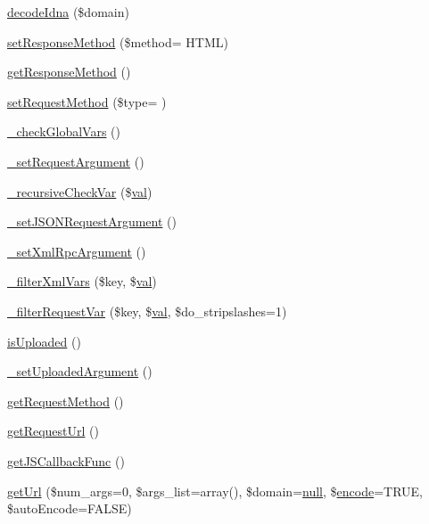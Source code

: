 \begin{DoxyCompactItemize}
\item 
\hyperlink{classContext_a122117b49e4926d40dc6fc76297792bc}{decode\+Idna} (\$domain)
\item 
\hyperlink{classContext_afc58a19e296dfc70a95648f35bb0f3a9}{set\+Response\+Method} (\$method= \textquotesingle{}H\+T\+ML\textquotesingle{})
\item 
\hyperlink{classContext_a1d02a15209360034cd719d8b08cb5061}{get\+Response\+Method} ()
\item 
\hyperlink{classContext_aa47d184757d451009f0597153d323ccc}{set\+Request\+Method} (\$type= \textquotesingle{}\textquotesingle{})
\item 
\hyperlink{classContext_a8030f7c76467bfcec812be76f55571cd}{\+\_\+check\+Global\+Vars} ()
\item 
\hyperlink{classContext_acfc274753d9687732458bfaba540c120}{\+\_\+set\+Request\+Argument} ()
\item 
\hyperlink{classContext_aae89f13e0d99577a6cb8a3bac584cee1}{\+\_\+recursive\+Check\+Var} (\$\hyperlink{ckeditor_2js_2xe__interface_8js_a4fb96abdf073a439bca5e051c333b35d}{val})
\item 
\hyperlink{classContext_ae07924273ca1b17fe67a7cf978d762fc}{\+\_\+set\+J\+S\+O\+N\+Request\+Argument} ()
\item 
\hyperlink{classContext_abaa9eeef192a9e4b48a06d0af9b1fd05}{\+\_\+set\+Xml\+Rpc\+Argument} ()
\item 
\hyperlink{classContext_a8104d3bb19322baf793f4a3cc0aad078}{\+\_\+filter\+Xml\+Vars} (\$key, \$\hyperlink{ckeditor_2js_2xe__interface_8js_a4fb96abdf073a439bca5e051c333b35d}{val})
\item 
\hyperlink{classContext_a3c411bc0bf786b605af4a7af8ad3ee53}{\+\_\+filter\+Request\+Var} (\$key, \$\hyperlink{ckeditor_2js_2xe__interface_8js_a4fb96abdf073a439bca5e051c333b35d}{val}, \$do\+\_\+stripslashes=1)
\item 
\hyperlink{classContext_a65ee4d61d0211c8a3f0eeb4251c85892}{is\+Uploaded} ()
\item 
\hyperlink{classContext_a9c821f96670ef47c7139bafc6b39091b}{\+\_\+set\+Uploaded\+Argument} ()
\item 
\hyperlink{classContext_a6912ff86e08ef782a296b77ff1307481}{get\+Request\+Method} ()
\item 
\hyperlink{classContext_ace7f220a4d945de0172f0c1fc98fe31e}{get\+Request\+Url} ()
\item 
\hyperlink{classContext_ab2e157a87d2b960d78b2c3f35ae7da23}{get\+J\+S\+Callback\+Func} ()
\item 
\hyperlink{classContext_aa60b75d32d4923bb3b9854985a82ce36}{get\+Url} (\$num\+\_\+args=0, \$args\+\_\+list=array(), \$domain=\hyperlink{modernizr_8min_8js_a286f9ec831c5e676eeb493248eab9575}{null}, \$\hyperlink{ReadMe_8txt_a7fcb4e5f2b1b63096ccac2903dfbef97}{encode}=T\+R\+UE, \$auto\+Encode=F\+A\+L\+SE)

\end{DoxyCompactItemize}
